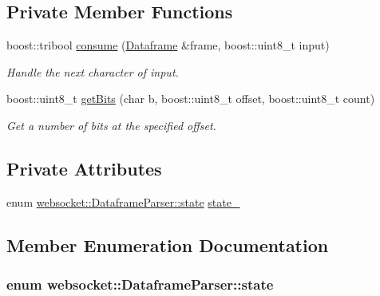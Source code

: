 \subsection*{Private Member Functions}
\begin{DoxyCompactItemize}
\item 
boost\+::tribool \hyperlink{classwebsocket_1_1DataframeParser_a2f14d531bafe3bd65977f4eaecc78765}{consume} (\hyperlink{structwebsocket_1_1Dataframe}{Dataframe} \&frame, boost\+::uint8\+\_\+t input)
\begin{DoxyCompactList}\small\item\em Handle the next character of input. \end{DoxyCompactList}\item 
boost\+::uint8\+\_\+t \hyperlink{classwebsocket_1_1DataframeParser_af034682aa527e1d3d1e0b3da31b6c7d3}{get\+Bits} (char b, boost\+::uint8\+\_\+t offset, boost\+::uint8\+\_\+t count)
\begin{DoxyCompactList}\small\item\em Get a number of bits at the specified offset. \end{DoxyCompactList}\end{DoxyCompactItemize}
\subsection*{Private Attributes}
\begin{DoxyCompactItemize}
\item 
enum \hyperlink{classwebsocket_1_1DataframeParser_a2285d0f76dcfd6dadbe70a78c5e3de8a}{websocket\+::\+Dataframe\+Parser\+::state} \hyperlink{classwebsocket_1_1DataframeParser_a46525ab8a38ba649b49faa6bf3b0c959}{state\+\_\+}
\end{DoxyCompactItemize}


\subsection{Member Enumeration Documentation}
\subsubsection[{\texorpdfstring{state}{state}}]{\setlength{\rightskip}{0pt plus 5cm}enum {\bf websocket\+::\+Dataframe\+Parser\+::state}\hspace{0.3cm}{\ttfamily [private]}}\hypertarget{classwebsocket_1_1DataframeParser_a2285d0f76dcfd6dadbe70a78c5e3de8a}{}\label{classwebsocket_1_1DataframeParser_a2285d0f76dcfd6dadbe70a78c5e3de8a}



